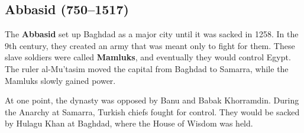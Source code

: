 \subsection*{Abbasid (750--1517)}

The \textbf{Abbasid} set up Baghdad as a major city until it was sacked in 1258.
In the 9th century, they created an army that was meant only to fight for them.
These slave soldiers were called \textbf{Mamluks}, and eventually they would control Egypt.
The ruler al-Mu'tasim moved the capital from Baghdad to Samarra,
while the Mamluks slowly gained power.

At one point, the dynasty was opposed by Banu and Babak Khorramdin.
During the Anarchy at Samarra, Turkish chiefs fought for control.
They would be sacked by Hulagu Khan at Baghdad, where the House of Wisdom was held.
